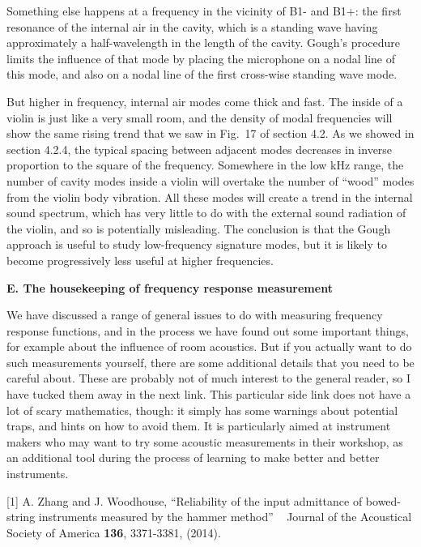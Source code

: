   Something else happens at a frequency in the vicinity of B1- and B1+: the 
  first resonance of the internal air in the cavity, which is a standing wave 
  having approximately a half-wavelength in the length of the cavity. Gough’s 
  procedure limits the influence of that mode by placing the microphone on a 
  nodal line of this mode, and also on a nodal line of the first cross-wise 
  standing wave mode. 

  But higher in frequency, internal air modes come thick and fast. The inside 
  of a violin is just like a very small room, and the density of modal 
  frequencies will show the same rising trend that we saw in Fig.\ 17 of 
  section 4.2. As we showed in section 4.2.4, the typical spacing between 
  adjacent modes decreases in inverse proportion to the square of the 
  frequency. Somewhere in the low kHz range, the number of cavity modes inside 
  a violin will overtake the number of “wood” modes from the violin body 
  vibration. All these modes will create a trend in the internal sound 
  spectrum, which has very little to do with the external sound radiation of 
  the violin, and so is potentially misleading. The conclusion is that the 
  Gough approach is useful to study low-frequency signature modes, but it is 
  likely to become progressively less useful at higher frequencies. 

  \textbf{E. The housekeeping of frequency response measurement} 

  We have discussed a range of general issues to do with measuring frequency 
  response functions, and in the process we have found out some important 
  things, for example about the influence of room acoustics. But if you 
  actually want to do such measurements yourself, there are some additional 
  details that you need to be careful about. These are probably not of much 
  interest to the general reader, so I have tucked them away in the next link. 
  This particular side link does not have a lot of scary mathematics, though: 
  it simply has some warnings about potential traps, and hints on how to avoid 
  them. It is particularly aimed at instrument makers who may want to try some 
  acoustic measurements in their workshop, as an additional tool during the 
  process of learning to make better and better instruments. 



  \sectionreferences{}[1] A. Zhang and J. Woodhouse, “Reliability of the input 
  admittance of bowed-string instruments measured by the hammer method” ~ 
  Journal of the Acoustical Society of America \textbf{136}, 3371-3381, (2014). 

